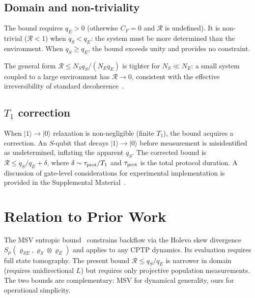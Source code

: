 \documentclass[aps,pra,twocolumn,superscriptaddress,hyperref]{revtex4-2}
\begin{document}
\subsection{Domain and non-triviality}

The bound requires $q_E > 0$ (otherwise $C_F = 0$ and $\mathcal{R}$ is undefined). It is non-trivial ($\mathcal{R} < 1$) when $q_S < q_E$: the system must be more determined than the environment. When $q_S \geq q_E$, the bound exceeds unity and provides no constraint.

The general form $\mathcal{R} \leq N_S q_S/(N_E q_E)$ is tighter for $N_S \ll N_E$: a small system coupled to a large environment has $\mathcal{R} \to 0$, consistent with the effective irreversibility of standard decoherence~\cite{Breuer:2016}.

\subsection{$T_1$ correction}

When $|1\rangle \to |0\rangle$ relaxation is non-negligible (finite $T_1$), the bound acquires a correction. An $S$-qubit that decays $|1\rangle \to |0\rangle$ before measurement is misidentified as undetermined, inflating the apparent $q_S$. The corrected bound is $\mathcal{R} \leq q_S/q_E + \delta$, where $\delta \sim \tau_{\rm prot}/T_1$ and $\tau_{\rm prot}$ is the total protocol duration. A discussion of gate-level considerations for experimental implementation is provided in the Supplemental Material~\cite{SM}.

\section{Relation to Prior Work}

The MSV entropic bound~\cite{Megier:2021} constrains backflow via the Holevo skew divergence $S_\mu(\varrho_{SE}, \varrho_S \otimes \varrho_E)$ and applies to any CPTP dynamics. Its evaluation requires full state tomography. The present bound $\mathcal{R} \leq q_S/q_E$ is narrower in domain (requires unidirectional $L$) but requires only projective population measurements. The two bounds are complementary: MSV for dynamical generality, ours for operational simplicity.
\end{document}
